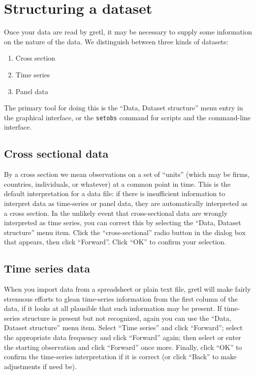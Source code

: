 \section{Structuring a dataset}
\label{sec:data-structure}

Once your data are read by gretl, it may be necessary to supply
some information on the nature of the data. We distinguish between
three kinds of datasets:
\begin{enumerate}
\item Cross section
\item Time series
\item Panel data
\end{enumerate}

The primary tool for doing this is the ``Data, Dataset structure''
menu entry in the graphical interface, or the \texttt{setobs} command
for scripts and the command-line interface.

\subsection{Cross sectional data}
\label{sec:cross-section-data}

By a cross section we mean observations on a set of ``units'' (which
may be firms, countries, individuals, or whatever) at a common point
in time.  This is the default interpretation for a data file: if there
is insufficient information to interpret data as time-series or panel
data, they are automatically interpreted as a cross section.  In the
unlikely event that cross-sectional data are wrongly interpreted as
time series, you can correct this by selecting the ``Data, Dataset
structure'' menu item.  Click the ``cross-sectional'' radio button in
the dialog box that appears, then click ``Forward''.  Click ``OK'' to
confirm your selection.

\subsection{Time series data}
\label{sec:timeser-data}

When you import data from a spreadsheet or plain text file,
gretl will make fairly strenuous efforts to glean time-series
information from the first column of the data, if it looks at all
plausible that such information may be present.  If time-series
structure is present but not recognized, again you can use the ``Data,
Dataset structure'' menu item.  Select ``Time series'' and click
``Forward''; select the appropriate data frequency and click
``Forward'' again; then select or enter the starting observation and
click ``Forward'' once more.  Finally, click ``OK'' to confirm the
time-series interpretation if it is correct (or click ``Back'' to make
adjustments if need be).

